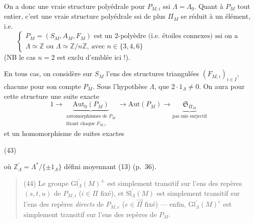 \documentclass[11pt,a4paper]{article}
\begin{document}
On a donc une vraie structure polyédrale pour $P_{M,i}$ ssi $\Lambda=\Lambda_0$.
Quant à $P_M$ tout entier, c'est une vraie structure polyédrale ssi de plus
$\Pi_M$ se réduit à un élément, i.e.
\[
\tag{41}
\begin{cases}
P_M = (S_M, A_M, F_M) \text{ est un 2-polyèdre (i.e. étoiles connexes) ssi on a}\\
\Lambda\simeq\mathbb{Z} \text{ ou } \Lambda\simeq\mathbb{Z}/n\mathbb{Z},\ \text{avec } n\in\{3,4,6\}
\end{cases}
\]
(NB le cas $n=2$ est exclu d'emblée ici !).

En tous cas, on considère sur $S_M$ l'ens des structures triangulées
$(F_{M,i})_{i\in I}$,  chacune pour son compte $P_M$. Sous l'hypothèse
 $\Lambda$,  que $2\cdot 1_\Lambda\neq 0$. On aura pour
cette structure une suite exacte
\[
\tag{42}
1\longrightarrow \underbrace{\mathrm{Aut}_0(P_M)}_{\substack{\text{automorphismes de } P_M\\ \text{fixant chaque } F_{M,i}}}
\longrightarrow \mathrm{Aut}(P_M) \longrightarrow
\underbrace{\mathfrak{S}_{\Pi_M}}_{\text{pas mis surjectif}}
\]
et un homomorphisme de suites exactes

(43)


où $\mathbb{Z}^{\prime}_\Lambda = \Lambda^{*}/\{\pm 1_\Lambda\}$ défini moyennant
 (13) (p.~36).

\begin{quote}
(44) Le groupe $\mathrm{Gl}^{\prime}_\Lambda(M)^{\pm}$ est simplement transitif sur l'ens
des repères $(s,t,u)$ de $P_{M,i}$ ($i\in\Pi$ fixé), et $\mathrm{Sl}^{\prime}_\Lambda(M)$ est
simplement transitif sur l'ens des repères \emph{directs} de $P_{M,e}$
($e\in\vec{\Pi}$ fixé) — enfin, $\mathrm{Gl}^{\prime}_\Lambda(M)^{\varepsilon}$ est simplement
transitif sur l'ens des repères de $P_M$.
\end{quote}
\end{document}
